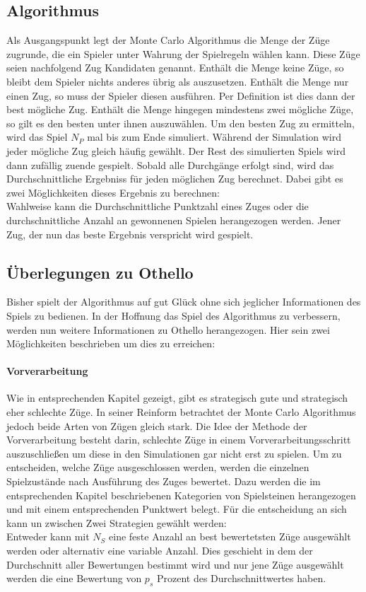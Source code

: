 \subsection{Algorithmus}
Als Ausgangspunkt legt der Monte Carlo Algorithmus die Menge der Züge zugrunde, die ein Spieler unter Wahrung der Spielregeln wählen kann. Diese Züge seien nachfolgend Zug Kandidaten genannt. Enthält die Menge keine Züge, so bleibt dem Spieler nichts anderes übrig als auszusetzen. Enthält die Menge nur einen Zug, so muss der Spieler diesen ausführen. Per Definition ist dies dann der best mögliche Zug. Enthält die Menge hingegen mindestens zwei mögliche Züge, so gilt es den besten unter ihnen auszuwählen. Um den besten Zug zu ermitteln, wird das Spiel $N_{P}$ mal bis zum Ende simuliert. Während der Simulation wird jeder mögliche Zug gleich häufig gewählt. Der Rest des simulierten Spiels wird dann zufällig zuende gespielt. Sobald alle Durchgänge erfolgt sind, wird das Durchschnittliche Ergebniss für jeden möglichen Zug berechnet. Dabei gibt es zwei Möglichkeiten dieses Ergebnis zu berechnen:\\
Wahlweise kann die Durchschnittliche Punktzahl eines Zuges oder die durchschnittliche Anzahl an gewonnenen Spielen herangezogen werden. Jener Zug, der nun das beste Ergebnis verspricht wird gespielt.
\subsection{Überlegungen zu Othello}
Bisher spielt der Algorithmus auf gut Glück ohne sich jeglicher Informationen des Spiels zu bedienen. In der Hoffnung das Spiel des Algorithmus zu verbessern, werden nun weitere Informationen zu Othello herangezogen. Hier sein zwei Möglichkeiten beschrieben um dies zu erreichen:
\paragraph{Vorverarbeitung}Wie in entsprechenden Kapitel gezeigt, gibt es strategisch gute und strategisch eher schlechte Züge. In seiner Reinform betrachtet der Monte Carlo Algorithmus jedoch beide Arten von Zügen gleich stark. Die Idee der Methode der Vorverarbeitung besteht darin, schlechte Züge in einem Vorverarbeitungsschritt auszuschließen um diese in den Simulationen gar nicht erst zu spielen. Um zu entscheiden, welche Züge ausgeschlossen werden, werden die einzelnen Spielzustände nach Ausführung des Zuges bewertet. Dazu werden die im entsprechenden Kapitel beschriebenen Kategorien von Spielsteinen herangezogen und mit einem entsprechenden Punktwert belegt. Für die entscheidung an sich kann un zwischen Zwei Strategien gewählt werden:\\
Entweder kann mit $N_{S}$ eine feste Anzahl an best bewertetsten Züge ausgewählt werden oder alternativ eine variable Anzahl. Dies geschieht in dem der Durchschnitt aller Bewertungen bestimmt wird und nur jene Züge ausgewählt werden die eine Bewertung von $p_{s}$ Prozent des Durchschnittwertes haben.
